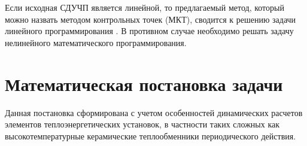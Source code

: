 \documentclass[a4paper,11pt,numreferences,mathsec,kaplist]{isuepsutf8}
\begin{document}
\begin{article}
%
%
%
Если исходная СДУЧП является линейной, то предлагаемый метод, который
можно назвать методом контрольных точек (МКТ), сводится к решению
задачи линейного программирования \cite{KBZ2012,YH1961,G2007}. В
противном случае необходимо решать задачу нелинейного математического
программирования.

\section{Математическая постановка задачи}

Данная постановка сформирована с учетом особенностей динамических расчетов
элементов теплоэнергетических установок, в частности таких сложных как
высокотемпературные керамические теплообменники периодического действия.


\end{article}
\end{document}
